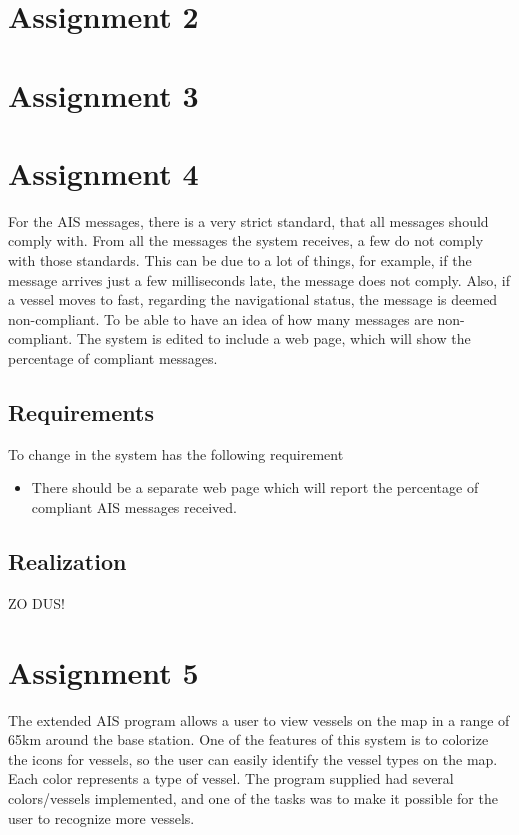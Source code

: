 \documentclass[12pt]{article}
\begin{document}
\section*{Assignment 2}

\section*{Assignment 3}

\section*{Assignment 4}
For the AIS messages, there is a very strict standard, that all  messages should comply with. From all the messages the system receives, a few do not comply with those standards. This can be due to a lot of things, for example, if the message arrives just a few milliseconds late, the message does not comply. Also, if a vessel moves to fast, regarding the navigational status, the message is deemed non-compliant. To be able to have an idea of how many messages are non-compliant. The system is edited to include a web page, which will show the percentage of compliant messages.

\subsection*{Requirements}
To change in the system has the following requirement
\begin{itemize}
\item There should be a separate web page which will report the percentage of compliant AIS messages received.
\end{itemize}

\subsection*{Realization}
ZO DUS!

\section*{Assignment 5}
The extended AIS program allows a user to view vessels on the map in a range of 65km around the base station. One of the features of this system is to colorize the icons for vessels, so the user can easily identify the vessel types on the map. Each color represents a type of vessel. The program supplied had several colors/vessels implemented, and one of the tasks was to make it possible for the user to recognize more vessels.
\end{document}
